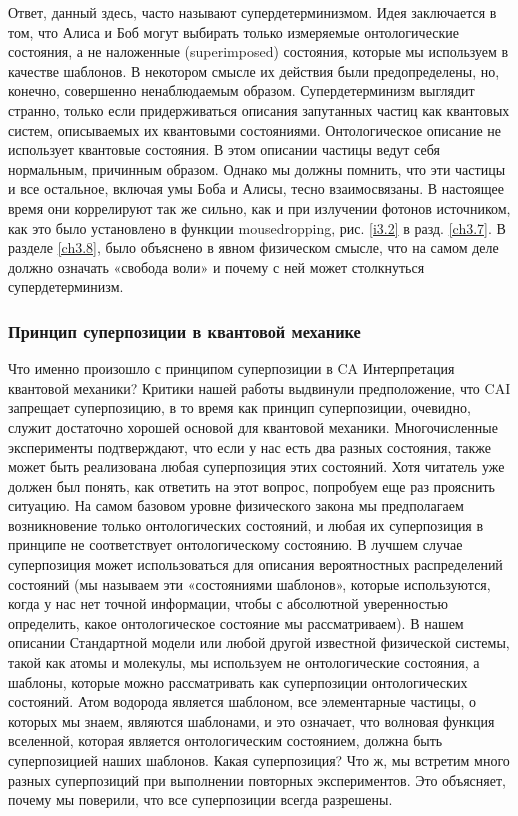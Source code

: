 \documentclass[main.tex]{subfiles}
\begin{document}
Ответ, данный здесь, часто называют супердетерминизмом. Идея заключается в том, что Алиса и Боб могут выбирать только измеряемые онтологические состояния, а не наложенные (superimposed) состояния, которые мы используем в качестве шаблонов. В некотором смысле их действия были предопределены, но, конечно, совершенно ненаблюдаемым образом. Супердетерминизм выглядит странно, только если придерживаться описания запутанных частиц как квантовых систем, описываемых их квантовыми состояниями. Онтологическое описание не использует квантовые состояния. В этом описании частицы ведут себя нормальным, причинным образом. Однако мы должны помнить, что эти частицы и все остальное, включая умы Боба и Алисы, тесно взаимосвязаны. В настоящее время они коррелируют так же сильно, как и при излучении фотонов источником, как это было установлено в функции mousedropping, рис. \ref{i3.2} в разд. \ref{ch3.7}.
В разделе \ref{ch3.8}, было объяснено в явном физическом смысле, что на самом деле должно означать «свобода воли» и почему с ней может столкнуться супердетерминизм.

\subsubsection{Принцип суперпозиции в квантовой механике}\label{ch5.7.4}

Что именно произошло с принципом суперпозиции в CA Интерпретация квантовой механики? Критики нашей работы выдвинули предположение, что CAI запрещает суперпозицию, в то время как принцип суперпозиции, очевидно, служит достаточно хорошей основой для квантовой механики. Многочисленные эксперименты подтверждают, что если у нас есть два разных состояния, также может быть реализована любая суперпозиция этих состояний. Хотя читатель уже должен был понять, как ответить на этот вопрос, попробуем еще раз прояснить ситуацию.
На самом базовом уровне физического закона мы предполагаем возникновение только онтологических состояний, и любая их суперпозиция в принципе не соответствует онтологическому состоянию. В лучшем случае суперпозиция может использоваться для описания вероятностных распределений состояний (мы называем эти «состояниями шаблонов», которые используются, когда у нас нет точной информации, чтобы с абсолютной уверенностью определить, какое онтологическое состояние мы рассматриваем). В нашем описании Стандартной модели или любой другой известной физической системы, такой как атомы и молекулы, мы используем не онтологические состояния, а шаблоны, которые можно рассматривать как суперпозиции онтологических состояний. Атом водорода является шаблоном, все элементарные частицы, о которых мы знаем, являются шаблонами, и это означает, что волновая функция вселенной, которая является онтологическим состоянием, должна быть суперпозицией наших шаблонов. Какая суперпозиция? Что ж, мы встретим много разных суперпозиций при выполнении повторных экспериментов. Это объясняет, почему мы поверили, что все суперпозиции всегда разрешены.
\end{document}
